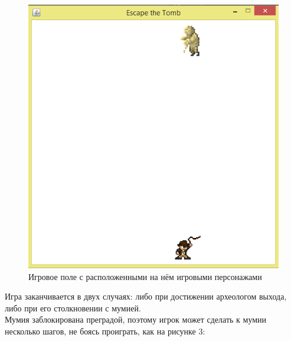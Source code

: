 \documentclass[a4paper]{article}
\begin{document}
\begin{figure}[H]
	\begin{center}
		\includegraphics[scale=0.7]{image/field1.png}
		\caption{Игровое поле с расположенными на нём игровыми персонажами} 
		\label{pic:pic_name} %
	\end{center}
\end{figure}

Игра заканчивается в двух случаях: либо при достижении археологом выхода, либо при его столкновении с мумией.\\

Мумия заблокирована преградой, поэтому игрок может сделать к мумии несколько шагов, не боясь проиграть, как на рисунке 3:
\end{document}
